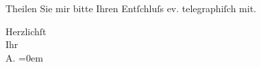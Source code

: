 \pstart
           Theilen Sie mir bitte Ihren {\pb}Entſchluſs ev.
               telegraphiſch mit.\pend
           
\pstart
           Herzlichſt{\\[\baselineskip]}Ihr{\\[\baselineskip]}\spacefill\mbox{A.}\pend
           \leftskip=0em{}\endnumbering{}  \newcommand{\dateiname}{L01442}\newcommand{\titel}{Arthur Schnitzler an Richard Beer-Hofmann, 10. 9. 1904}\newcommand{\editorInnen}{Martin Anton Müller und Gerd-Hermann Susen}
